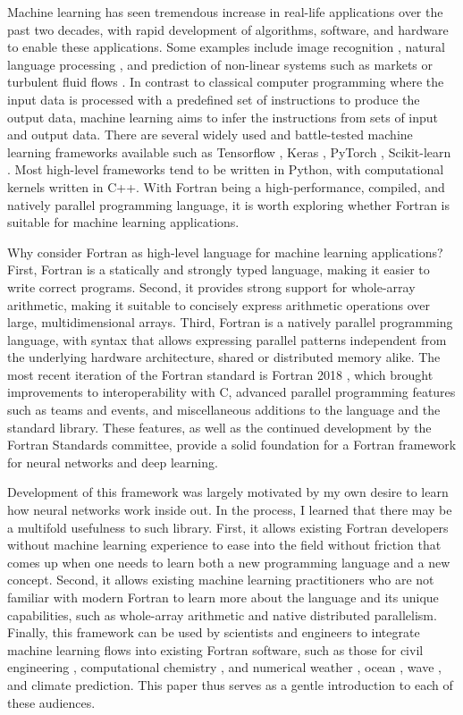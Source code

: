 \documentclass[sigplan, review=false, screen=true, balance=true]{acmart}
\begin{document}
Machine learning has seen tremendous increase in real-life applications
over the past two decades, with rapid development of algorithms, software,
and hardware to enable these applications. Some examples include image
recognition \citep{krizhevsky09}, natural language processing \citep{goldberg16},
and prediction of non-linear systems such as markets \citep{kimoto90} or
turbulent fluid flows \citep{kutz17}.
In contrast to classical computer programming where the input data is processed
with a predefined set of instructions to produce the output data, machine
learning aims to infer the instructions from sets of input and output data.
There are several widely used and battle-tested machine learning frameworks
available such as Tensorflow \citep{abadi16}, Keras \citep{chollet15},
PyTorch \citep{paszke17}, Scikit-learn \citep{pendregosa11}.
Most high-level frameworks tend to be written in Python, with computational
kernels written in C++. With Fortran being a high-performance, compiled, and
natively parallel programming language, it is worth exploring whether Fortran
is suitable for machine learning applications.

Why consider Fortran as high-level language for machine learning applications?
First, Fortran is a statically and strongly typed language, making it
easier to write correct programs. Second, it provides strong support for whole-array
arithmetic, making it suitable to concisely express arithmetic operations over
large, multidimensional arrays. Third, Fortran is a natively parallel
programming language, with syntax that allows expressing parallel patterns
independent from the underlying hardware architecture, shared or distributed
memory alike. The most recent iteration of the Fortran standard is Fortran 2018
\citep{reid18}, which brought improvements to interoperability with C,
advanced parallel programming features such as teams and events, and
miscellaneous additions to the language and the standard library.
These features, as well as the continued development by
the Fortran Standards committee, provide a solid foundation for a
Fortran framework for neural networks and deep learning.

Development of this framework was largely motivated by my own desire to learn
how neural networks work inside out. In the process, I learned that there
may be a multifold usefulness to such library. First, it allows existing
Fortran developers without machine learning experience to ease into the field
without friction that comes up when one needs to learn both a new programming
language and a new concept.
Second, it allows existing machine learning practitioners who are not
familiar with modern Fortran to learn more about the language and its unique
capabilities, such as whole-array arithmetic and native distributed parallelism.
Finally, this framework can be used by scientists and engineers
to integrate machine learning flows into existing Fortran software, such as
those for civil engineering \citep{fischer08},
computational chemistry \citep{valiev10},
and numerical weather \citep{powers17}, ocean \citep{chassignet06},
wave \citep{donelan12}, and climate \citep{hurell13} prediction.
This paper thus serves as a gentle introduction to each of these audiences.
\end{document}
